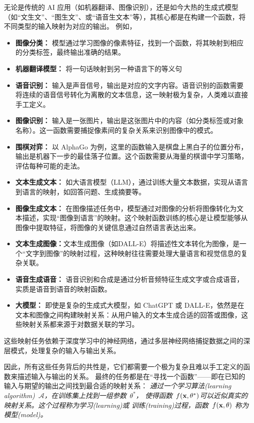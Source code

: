无论是传统的 AI 应用（如机器翻译、图像识别），还是如今大热的生成式模型（如“文生文”、“图生文”、或“语音生文本”等），其核心都是在构建一个函数，将不同类型的输入映射为对应的输出。
例如，
\begin{itemize}
\item {\bf 图像分类：} 模型通过学习图像的像素特征，找到一个函数，将其映射到相应的分类标签，最终输出准确的结果。 
\item {\bf 机器翻译模型：} 将一句话映射到另一种语言下的等义句
\item {\bf 语音识别：} 输入是声音信号，输出是对应的文字内容。语音识别的函数需要将连续的语音信号转化为离散的文本信息，这一映射极为复杂，人类难以直接手工定义。
\item {\bf  图像识别：} 输入是一张图片，输出是这张图片中的内容（如分类标签或对象名称）。这一函数需要捕捉像素间的复杂关系来识别图像中的模式。
\item {\bf 围棋对弈：} 以 AlphaGo 为例，这里的函数输入是棋盘上黑白子的位置分布，输出是机器下一步的最佳落子位置。这个函数需要从海量的棋谱中学习策略，评估每种可能的走法。
\item {\bf 文本生成文本：} 如大语言模型（LLM），通过训练大量文本数据，实现从语言到语言的映射，如回答问题、生成摘要等。 
\item {\bf 图像生成文本：} 在图像描述任务中，模型通过对图像的分析将图像转化为文本描述，实现“图像到语言”的映射。这个映射函数训练的核心是让模型能够从图像中提取特征，将图像的关键信息通过自然语言表达出来。
\item {\bf 文本生成图像：}文本生成图像（如DALL-E）将描述性文本转化为图像，是一个“文字到图像”的映射过程，这种映射往往需要处理大量语言和视觉信息的复杂关联。
\item {\bf 语音生成语音：} 语音识别和合成是通过分析音频特征生成文字或合成语音，实质是语音到语音的映射函数。
\item {\bf 大模型：} 即使是复杂的生成式大模型，如 ChatGPT 或 DALL-E，依然是在文本和图像之间构建映射关系：从用户输入的文本生成合适的回答或图像，这些映射关系都来源于对数据关联的学习。
\end{itemize}
这些映射任务依赖于深度学习中的神经网络，通过多层神经网络捕捉数据之间的深层模式，处理复杂的输入与输出关系。

因此，所有这些任务背后的共性是，它们都需要一个极为复杂且难以手工定义的函数来描述输入与输出的关系。
最终的任务都是在“寻找一个函数”——即在已知的输入与期望的输出之间找到最合适的映射关系：
{\em 通过一个学习算法(learning algorithm)~$\mathcal{A}$，在训练集上找到一组参数~$\theta^\ast$， 使得函数~$f({\bf x}, \theta^\ast)$可以近似真实的映射关系。这个过程称为学习(learning)或 训练(training)过程，函数~$f({\bf x}, \theta)$ 称为模型(model)。}

